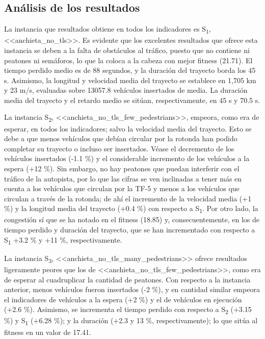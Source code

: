 \subsection{Análisis de los resultados}

La instancia que resultados obtiene en todos los indicadores es S\textsubscript{1}, <<anchieta\_no\_tls>>. Es evidente que los excelentes resultados que ofrece esta instancia se deben a la falta de obstáculos al tráfico, puesto que no contiene ni peatones ni semáforos, lo que la coloca a la cabeza con mejor fitness (21.71). El tiempo perdido medio es de 88 segundos, y la duración del trayecto borda los 45 s. Asimismo, la longitud y velocidad media del trayecto se establece en 1,705 km y 23 m/s, evaluadas sobre 13057.8 vehículos insertados de media. La duración media del trayecto y el retardo medio se sitúan, respectivamente, en 45 s y 70.5 s.

La instancia S\textsubscript{2}, <<anchieta\_no\_tls\_few\_pedestrians>>, empeora, como era de esperar, en todos los indicadores; salvo la velocidad media del trayecto. Esto se debe a que menos vehículos que debían circular por la rotonda han podido completar su trayecto o incluso ser insertados. Véase el decremento de los vehículos insertados (-1.1 \%) y el considerable incremento de los vehículos a la espera (+12 \%). Sin embargo, no hay peatones que puedan interferir con el tráfico de la autopista, por lo que las cifras se ven inclinadas a tener más en cuenta a los vehículos que circulan por la TF-5 y menos a los vehículos que circulan a través de la rotonda; de ahí el incremento de la velocidad media (+1 \%) y la longitud media del trayecto (+0.4 \%) con respecto a S\textsubscript{1}. Por otro lado, la congestión sí que se ha notado en el fitness (18.85) y, consecuentemente, en los de tiempo perdido y duración del trayecto, que se han incrementado con respecto a S\textsubscript{1} +3.2 \% y +11 \%, respectivamente.

La instancia S\textsubscript{3}, <<anchieta\_no\_tls\_many\_pedestrians>> ofrece resultados ligeramente peores que los de <<anchieta\_no\_tls\_few\_pedestrians>>, como era de esperar al cuadruplicar la cantidad de peatones. Con respecto a la instancia anterior, menos vehículos fueron insertados (-2 \%), y en cantidad similar empeora el indicadores de vehículos a la espera (+2 \%) y el de vehículos en ejecución (+2.6 \%). Asimismo, se incrementa el tiempo perdido con respecto a S\textsubscript{2} (+3.15 \%) y S\textsubscript{1} (+6.28 \%); y la duración (+2.3 y 13 \%, respectivamente); lo que sitúa al fitness en un valor de 17.41.

